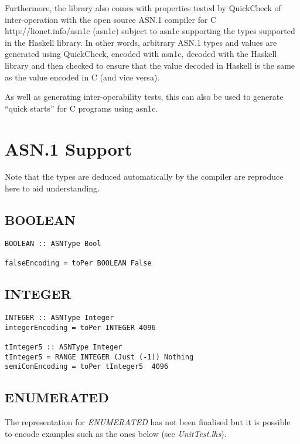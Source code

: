 \documentclass{article}
\begin{document}
Furthermore, the library also comes with properties tested by QuickCheck of inter-operation with
\htmladdnormallinkfoot
{the open source ASN.1 compiler for C}
{http://lionet.info/asn1c}
(asn1c) subject to asn1c supporting the types supported in the Haskell
library. In other words, arbitrary ASN.1 types and values are generated using QuickCheck,
encoded with asn1c, decoded with the Haskell library and then checked
to ensure that the value decoded in Haskell is the same as the value
encoded in C (and vice versa). 

As well as generating inter-operability tests,
this can also be used to generate ``quick starts'' for C programs using asn1c.

\section{ASN.1 Support}

Note that the types are deduced automatically by the compiler are 
reproduce here to aid understanding.

\subsection{BOOLEAN}

\lstset{language=Haskell}

\begin{lstlisting}[frame=single]
BOOLEAN :: ASNType Bool

falseEncoding = toPer BOOLEAN False
\end{lstlisting}

\subsection{INTEGER}

\begin{lstlisting}[frame=single]
INTEGER :: ASNType Integer
integerEncoding = toPer INTEGER 4096

tInteger5 :: ASNType Integer
tInteger5 = RANGE INTEGER (Just (-1)) Nothing
semiConEncoding = toPer tInteger5  4096
\end{lstlisting}

\subsection{ENUMERATED}

The representation for {\em ENUMERATED} has not been finalised but it is
possible to encode examples such as the ones below (see {\em UnitTest.lhs}).
\end{document}
